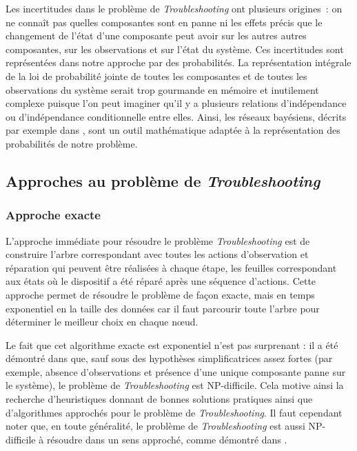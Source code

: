 \documentclass[a4paper,11pt]{article}
\theoremstyle{plain}
\begin{document}
Les incertitudes dans le problème de \emph{Troubleshooting} ont plusieurs origines~: on ne connaît pas quelles composantes sont en panne ni les effets précis que le changement de l'état d'une composante peut avoir sur les autres autres composantes, sur les observations et sur l'état du système. Ces incertitudes sont représentées dans notre approche par des probabilités. La représentation intégrale de la loi de probabilité jointe de toutes les composantes et de toutes les observations du système serait trop gourmande en mémoire et inutilement complexe puisque l'on peut imaginer qu'il y a plusieurs relations d'indépendance ou d'indépendance conditionnelle entre elles. Ainsi, les réseaux bayésiens, décrits par exemple dans \cite{Jensen_2007}, sont un outil mathématique adaptée à la représentation des probabilités de notre problème.

\subsection{Approches au problème de \emph{Troubleshooting}}

\subsubsection{Approche exacte}

L'approche immédiate pour résoudre le problème \emph{Troubleshooting} est de construire l'arbre correspondant avec toutes les actions d'observation et réparation qui peuvent être réalisées à chaque étape, les feuilles correspondant aux états où le dispositif a été réparé après une séquence d'actions. Cette approche permet de résoudre le problème de façon exacte, mais en temps exponentiel en la taille des données car il faut parcourir toute l'arbre pour déterminer le meilleur choix en chaque nœud.

Le fait que cet algorithme exacte est exponentiel n'est pas surprenant : il a été démontré dans \cite{Vomlelov__2003} que, sauf sous des hypothèses simplificatrices assez fortes (par exemple, absence d'observations et présence d'une unique composante panne sur le système), le problème de \emph{Troubleshooting} est NP-difficile. Cela motive ainsi la recherche d'heuristiques donnant de bonnes solutions pratiques ainsi que d'algorithmes approchés pour le problème de \emph{Troubleshooting}. Il faut cependant noter que, en toute généralité, le problème de \emph{Troubleshooting} est aussi NP-difficile à résoudre dans un sens approché, comme démontré dans \cite{L_n_2014}.
\end{document}
